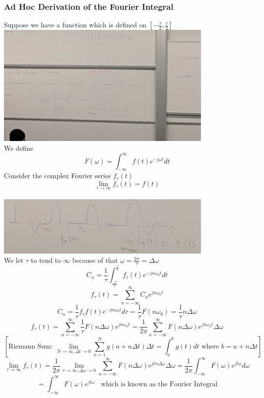 \documentclass[11pt]{article}
\theoremstyle{definition}
\begin{document}
\subsubsection{Ad Hoc Derivation of the Fourier Integral}
Suppose we have a function which is defined on $[-\frac{\tau}{2}, \frac{\tau}{2}]$
\\
\includegraphics[width=0.8\textwidth]{non-periodic.jpeg}\\

We define
$$F(\omega) =  \int^{\infty}_{-\infty} f(t) e^{-j\omega t}dt $$
Consider the complex Fourier series $f_\tau (t)$
$$\lim_{\tau\to\infty} f_\tau(t) = f(t)$$\\
\includegraphics[width=0.8\textwidth]{periodic.jpg}\\

We let $\tau$ to tend to $\infty$ because of that $\omega = \frac{2\pi}{\tau} = \Delta \omega$
$$C_n = \frac{1}{\tau} \int^{\frac{\tau}{2}}_{\frac{-\tau}{2}}f_\tau (t) e^{-jn\omega_0 t}dt$$
$$f_\tau(t) = \sum_{n = -\infty}^\infty C_ne^{jn\omega_0t}$$
$$C_n = \frac{1}{\tau}f_{\tau}f(t)e^{-jn\omega_0 t}dr = \frac{1}{\tau}F(n\omega_0) = \frac{1}{\tau}n\Delta\omega$$
$$f_\tau(t) = \sum_{n = -\infty}^\infty \frac{1}{\tau}F(n\Delta\omega)e^{jn\omega_0t} = \frac{1}{2\pi}\sum_{n = -\infty}^\infty F(n\Delta\omega)e^{jn\omega_0t}\Delta\omega $$
$$[\text{Riemann Sum: }\lim_{N\to\infty, \Delta t \to 0} \sum_{n = 1}^N g(a+n\Delta t) \Delta t = \int_a^b g(t)dt \text{ where } b = a + n\Delta t]$$
$$\lim_{\tau \to \infty} f_\tau (t) = \frac{1}{2\pi}\lim_{\tau \to \infty, \Delta\omega \to 0}\sum_{n=-\infty}^\infty F(n\Delta\omega)e^{jtn\Delta \omega}\Delta \omega = \frac{1}{2\pi}\int^\infty_{-\infty}F(\omega)  e^{jt\omega}d\omega$$
$$ = \int_{-\infty}^{\infty}F(\omega)e^{jt\omega}\;\; \text{ which is known as the Fourier Integral}$$
\end{document}
